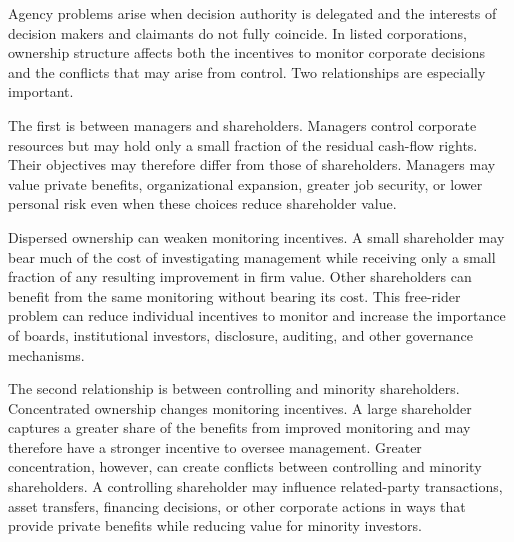 Agency problems arise when decision authority is delegated and the interests of decision makers and claimants do not fully coincide. In listed corporations, ownership structure affects both the incentives to monitor corporate decisions and the conflicts that may arise from control. Two relationships are especially important.

The first is between managers and shareholders. Managers control corporate resources but may hold only a small fraction of the residual cash-flow rights. Their objectives may therefore differ from those of shareholders. Managers may value private benefits, organizational expansion, greater job security, or lower personal risk even when these choices reduce shareholder value.

Dispersed ownership can weaken monitoring incentives. A small shareholder may bear much of the cost of investigating management while receiving only a small fraction of any resulting improvement in firm value. Other shareholders can benefit from the same monitoring without bearing its cost. This free-rider problem can reduce individual incentives to monitor and increase the importance of boards, institutional investors, disclosure, auditing, and other governance mechanisms.

The second relationship is between controlling and
minority shareholders. Concentrated ownership changes
monitoring incentives. A large shareholder captures
a greater share of the benefits from improved
monitoring and may therefore have a stronger
incentive to oversee management. Greater concentration,
however, can create conflicts between controlling
and minority shareholders. A controlling shareholder
may influence related-party transactions, asset
transfers, financing decisions, or other corporate
actions in ways that provide private benefits while
reducing value for minority investors.


